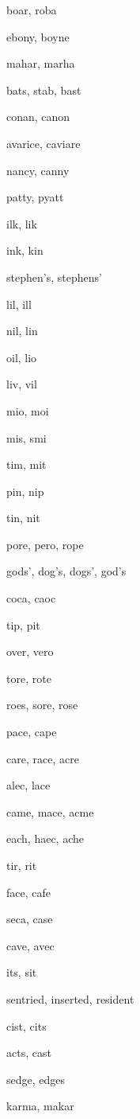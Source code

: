     \item boar, roba
    \item ebony, boyne
    \item mahar, marha
    \item bats, stab, bast
    \item conan, canon
    \item avarice, caviare
    \item nancy, canny
    \item patty, pyatt
    \item ilk, lik
    \item ink, kin
    \item stephen's, stephens'
    \item lil, ill
    \item nil, lin
    \item oil, lio
    \item liv, vil
    \item mio, moi
    \item mis, smi
    \item tim, mit
    \item pin, nip
    \item tin, nit
    \item pore, pero, rope
    \item gods', dog's, dogs', god's
    \item coca, caoc
    \item tip, pit
    \item over, vero
    \item tore, rote
    \item roes, sore, rose
    \item pace, cape
    \item care, race, acre
    \item alec, lace
    \item came, mace, acme
    \item each, haec, ache
    \item tir, rit
    \item face, cafe
    \item seca, case
    \item cave, avec
    \item its, sit
    \item sentried, inserted, resident
    \item cist, cits
    \item acts, cast
    \item sedge, edges
    \item karma, makar
